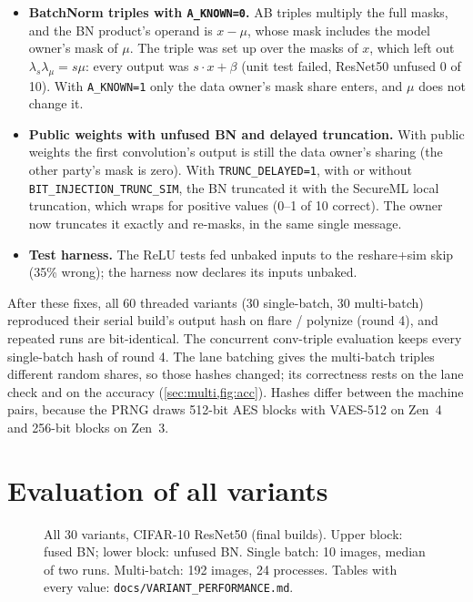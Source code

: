 \documentclass[10pt,a4paper]{article}
\newcommand{\flag}[1]{\nolinkurl{#1}}
\begin{document}
\begin{itemize}
  every threaded build classified at chance (1 of 10). With public weights and \flag{TRUNC_DELAYED=0} it truncated the
  first layer with the regular truncation while the completion expected the data owner's exact one, and both parties
  waited forever in preprocessing. It now follows the serial path.
\item \textbf{BatchNorm triples with \flag{A_KNOWN=0}.} AB triples multiply the full masks, and the BN product's operand is
  $x - \mu$, whose mask includes the model owner's mask of $\mu$. The triple was set up over the masks of $x$, which left
  out $\lambda_s\lambda_\mu = s\mu$: every output was $s\cdot x + \beta$ (unit test failed, ResNet50 unfused 0 of 10).
  With \flag{A_KNOWN=1} only the data owner's mask share enters, and $\mu$ does not change it.
\item \textbf{Public weights with unfused BN and delayed truncation.} With public weights the first convolution's output is
  still the data owner's sharing (the other party's mask is zero). With \flag{TRUNC_DELAYED=1}, with or without
  \flag{BIT_INJECTION_TRUNC_SIM}, the BN truncated it with the SecureML local truncation, which wraps for positive values
  (0--1 of 10 correct). The owner now truncates it exactly and re-masks, in the same single message.
\item \textbf{Test harness.} The ReLU tests fed unbaked inputs to the reshare+sim skip (35\% wrong); the
  harness now declares its inputs unbaked.
\end{itemize}

After these fixes, all 60 threaded variants (30 single-batch, 30 multi-batch) reproduced their serial build's output hash on flare /
polynize (round 4), and repeated runs are bit-identical. The concurrent conv-triple evaluation keeps every single-batch hash
of round 4. The lane batching gives the multi-batch triples different random shares, so those hashes changed; its
correctness rests on the lane check and on the accuracy (\cref{sec:multi,fig:acc}). Hashes differ between the machine pairs, because the PRNG
draws 512-bit AES blocks with VAES-512 on Zen~4 and 256-bit blocks on Zen~3.

\section{Evaluation of all variants}\label{sec:eval}

\begin{figure}[p]
  \centering
  \caption{All 30 variants, CIFAR-10 ResNet50 (final builds). Upper block: fused BN; lower block: unfused BN.
  Single batch: 10 images, median of two runs. Multi-batch: 192 images, 24 processes. Tables with every value:
  \texttt{docs/VARIANT\_PERFORMANCE.md}.}
  \label{fig:matrix}
\end{figure}
\end{document}
